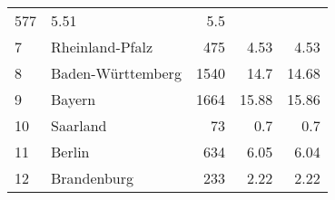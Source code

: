 \begin{longtable}{lXrrr}
       \num{577} &
       \num[round-mode=places,round-precision=2]{5.51} &
         \num[round-mode=places,round-precision=2]{5.5} \\

     7 &
     \multicolumn{1}{X}{ Rheinland-Pfalz   } &


       \num{475} &
       \num[round-mode=places,round-precision=2]{4.53} &
         \num[round-mode=places,round-precision=2]{4.53} \\

     8 &
     \multicolumn{1}{X}{ Baden-Württemberg   } &


       \num{1540} &
       \num[round-mode=places,round-precision=2]{14.7} &
         \num[round-mode=places,round-precision=2]{14.68} \\

     9 &
     \multicolumn{1}{X}{ Bayern   } &


       \num{1664} &
       \num[round-mode=places,round-precision=2]{15.88} &
         \num[round-mode=places,round-precision=2]{15.86} \\

     10 &
     \multicolumn{1}{X}{ Saarland   } &


       \num{73} &
       \num[round-mode=places,round-precision=2]{0.7} &
         \num[round-mode=places,round-precision=2]{0.7} \\

     11 &
     \multicolumn{1}{X}{ Berlin   } &


       \num{634} &
       \num[round-mode=places,round-precision=2]{6.05} &
         \num[round-mode=places,round-precision=2]{6.04} \\

     12 &
     \multicolumn{1}{X}{ Brandenburg   } &


       \num{233} &
       \num[round-mode=places,round-precision=2]{2.22} &
         \num[round-mode=places,round-precision=2]{2.22} \\


\end{longtable}
